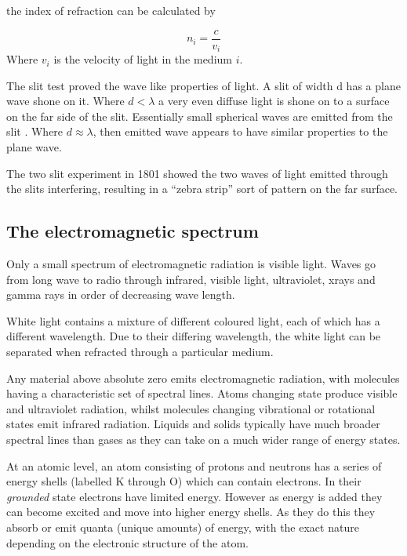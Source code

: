 the index of refraction can be calculated by 

\begin{equation}
n_i = \frac{c}{v_i}
\end{equation}
Where $v_i$ is the velocity of light in the medium $i$.

The slit test proved the wave like properties of light. A slit of width d has a plane wave shone on it. Where $d < \lambda$ a very even diffuse light is shone on to a surface on the far side of the slit. Essentially small spherical waves are emitted from the slit . Where $d \approx \lambda$, then emitted wave appears to have similar properties to the plane wave. 

The two slit experiment in 1801 showed the two waves of light emitted through the slits interfering, resulting in a ``zebra strip'' sort of pattern on the far surface. 

\subsection{The electromagnetic spectrum}

Only a small spectrum of electromagnetic radiation is visible light. Waves go from long wave to radio through infrared, visible light, ultraviolet, xrays and gamma rays in order of decreasing wave length. 

White light contains a mixture of different coloured light, each of which has a different wavelength. Due to their differing wavelength, the white light can be separated when refracted through a particular medium.

Any material above absolute zero emits electromagnetic radiation, with molecules having a characteristic set of spectral lines. Atoms changing state produce visible and ultraviolet radiation, whilst molecules changing vibrational or rotational states emit infrared radiation. Liquids and solids typically have much broader spectral lines than gases as they can take on a much wider range of energy states. 

At an atomic level, an atom consisting of protons and neutrons has a series of energy shells (labelled K through O) which can contain electrons. In their {\it grounded} state electrons have limited energy. However as energy is added they can become excited and move into higher energy shells. As they do this they absorb or emit quanta (unique amounts) of energy, with the exact nature depending on the electronic structure of the atom. 

